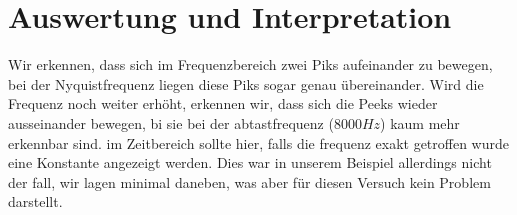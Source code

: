 \section{Auswertung und Interpretation}
\label{chap:AUSWERTUNGUNDINTERPRETATION5}
Wir erkennen, dass sich im Frequenzbereich zwei Piks aufeinander zu bewegen, bei der Nyquistfrequenz liegen diese Piks sogar genau übereinander. Wird die Frequenz noch weiter erhöht, erkennen wir, dass sich die Peeks wieder ausseinander bewegen, bi sie bei der abtastfrequenz (8000$Hz$) kaum mehr erkennbar sind. im Zeitbereich sollte hier, falls die frequenz exakt getroffen wurde eine Konstante angezeigt werden. Dies war in unserem Beispiel allerdings nicht der fall, wir lagen minimal daneben, was aber für diesen Versuch kein Problem darstellt.